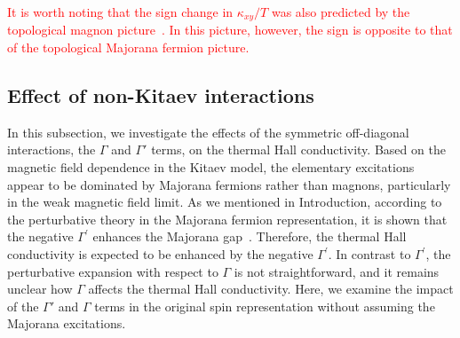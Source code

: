 \documentclass[twocolumn,superscriptaddress,showpacs, longbibliography, aps, prb]{revtex4-2}
\newcommand{\red}[1]{\textcolor{red}{#1}}
\newcommand{\orange}[1]{\textcolor{orange}{#1}}
\begin{document}
\red{It is worth noting that the sign change in $\kappa_{xy}/T$ was also predicted by the topological magnon picture~\cite{McClarty_PRB2018, Joshi_PRB2018, ChernZK2021}. 
In this picture, however, the sign is opposite to that of the topological Majorana fermion picture.} 


  
\subsection{Effect of non-Kitaev interactions}
\label{sec:Gamma}
In this subsection, we investigate the effects of the symmetric off-diagonal interactions, the $\Gamma$ and $\Gamma'$ terms, on the thermal Hall conductivity.
Based on the magnetic field dependence in the Kitaev model, the elementary excitations appear to be dominated by Majorana fermions rather than magnons, particularly %
in the weak magnetic field limit.
As we %
mentioned in Introduction, %
according to the perturbative theory in the Majorana fermion representation, it is shown that
the negative $\Gamma^{\prime}$ enhances the Majorana gap~\cite{Takikawa_PRB2020}. %
Therefore, %
the thermal Hall conductivity is 
expected to be
enhanced by the negative $\Gamma^{\prime}$.
In contrast to $\Gamma^{\prime}$, the perturbative expansion with respect to $\Gamma$
is not straightforward, and it %
remains unclear how $\Gamma$ affects the thermal Hall conductivity.
Here, we examine the %
impact of the $\Gamma'$ and $\Gamma$ %
terms in the original spin representation without assuming the Majorana excitations.
\end{document}
